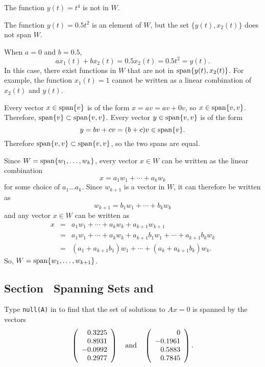 \documentclass{ximera}
\begin{document}
 The function $y(t) = t^4$ is not in $W$.

\ans The function $y(t) = 0.5t^2$ is an element of $W$, but the set
$\{y(t),x_2(t)\}$ does not span $W$.

\soln When $a = 0$ and $b = 0.5$,
\[ 
ax_1(t) + bx_2(t) = 0.5x_2(t) = 0.5t^2 = y(t). 
\]
In this case, there exist functions in $W$ that are not in 
${\rm span}\{y(t),x_2(t)\}$.  For example, the function $x_1(t) = 1$ cannot
be written as a linear combination of $x_2(t)$ and $y(t)$.

Every vector $x \in {\rm span}\{v\}$ is of the form $x = av
= av + 0v$, so $x \in {\rm span}\{v,v\}$.  Therefore, ${\rm span}\{v\}
\subset {\rm span}\{v,v\}$.  Every vector $y \in {\rm span}\{v,v\}$ is of the
form 
\[
y = bv + cv = (b + c)v \in {\rm span}\{v\}.
\]
Therefore ${\rm span}\{v,v\} \subset {\rm span}\{v,v\}$, so the two spans are equal.

Since $W = {\rm span}\{w_1,\dots ,w_k\}$, every vector $x \in W$ can be
written as the linear combination
\[ x = a_1w_1 + \cdots + a_kw_k \]
for some choice of $a_1 \dots a_k$.  Since $w_{k + 1}$ is a vector in
$W$, it can therefore be written as
\[ w_{k + 1} = b_1w_1 + \cdots + b_kw_k \]
and any vector $x \in W$ can be written as
\[ \begin{array}{rcl}
x & = &
a_1w_1 + \cdots + a_kw_k + a_{k+1}w_{k+1} \\
& = & a_1w_1 + \cdots + a_kw_k + a_{k+1}b_1w_1 + \cdots + a_{k+1}b_kw_k
\\ & = & (a_1 + a_{k+1}b_1)w_1 + \cdots + (a_k + a_{k+1}b_k)w_k.
\end{array} \]
So, $W = {\rm span}\{w_1,\dots ,w_{k+1}\}$.



\subsection*{Section~\protect{\ref{S:5.3}} Spanning Sets and \Matlab}

Type {\tt null(A)} in \Matlab to find that the set of solutions to
$Ax = 0$ is spanned by the vectors
\[
\left(\begin{array}{r} 0.3225 \\ 0.8931 \\ -0.0992 \\ 0.2977
\end{array}\right) \quad\mbox{and}\quad \left(\begin{array}{r} 0 \\ -0.1961 \\
0.5883 \\ 0.7845 \end{array}\right).
\]
\end{document}

